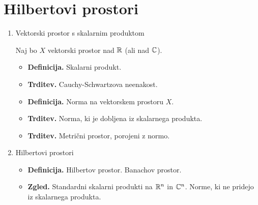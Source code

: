 \section{Hilbertovi prostori}
\begin{enumerate}
    \item Vektorski prostor s skalarnim produktom
    
    Naj bo \(X\) vektorski prostor nad \(\mathbb{R}\) (ali nad \(\mathbb{C}\)).
    \begin{itemize}
        \item \textbf{Definicija.} Skalarni produkt.
        \item \textbf{Trditev.} Cauchy-Schwartzova neenakost.
        \item \textbf{Definicija.} Norma na vektorskem prostoru \(X\).
        \item \textbf{Trditev.} Norma, ki je dobljena iz skalarnega produkta.
        \item \textbf{Trditev.} Metrični prostor, porojeni z normo.
    \end{itemize}

    \item Hilbertovi prostori
    \begin{itemize}
        \item \textbf{Definicija.} Hilbertov prostor. Banachov prostor.
        \item \textbf{Zgled.} Standardni skalarni produkti na \(\mathbb{R}^n\) in \(\mathbb{C}^n\). Norme, ki ne pridejo iz skalarnega produkta.
    \end{itemize}


\end{enumerate}
